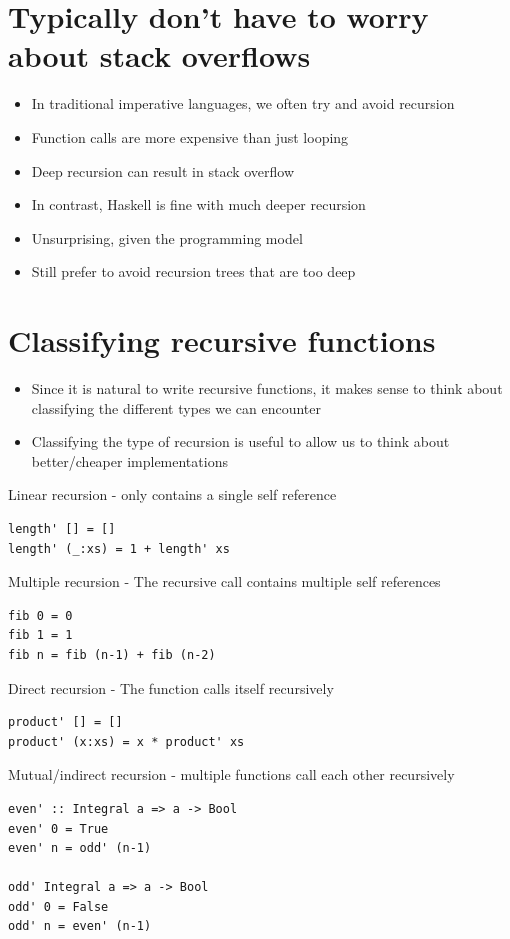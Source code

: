 \documentclass{article}[18pt]
\begin{document}
\section{Typically don't have to worry about stack overflows}
\begin{itemize}
	\item In traditional imperative languages, we often try and avoid recursion
	\item Function calls are more expensive than just looping
	\item Deep recursion can result in stack overflow
	\item In contrast, Haskell is fine with much deeper recursion
	\item Unsurprising, given the programming model
	\item Still prefer to avoid recursion trees that are too deep
\end{itemize}
\section{Classifying recursive functions}
\begin{itemize}
	\item Since it is natural to write recursive functions, it makes sense to think about classifying the different types we can encounter
	\item Classifying the type of recursion is useful to allow us to think about better/cheaper implementations
\end{itemize}
Linear recursion - only contains a single self reference
\begin{verbatim}
length' [] = []
length' (_:xs) = 1 + length' xs
\end{verbatim}
Multiple recursion - The recursive call contains multiple self references
\begin{verbatim}
fib 0 = 0
fib 1 = 1
fib n = fib (n-1) + fib (n-2)
\end{verbatim}
Direct recursion - The function calls itself recursively
\begin{verbatim}
product' [] = []
product' (x:xs) = x * product' xs
\end{verbatim}
Mutual/indirect recursion - multiple functions call each other recursively
\begin{verbatim}
even' :: Integral a => a -> Bool
even' 0 = True
even' n = odd' (n-1)

odd' Integral a => a -> Bool
odd' 0 = False
odd' n = even' (n-1)
\end{verbatim}
\end{document}
